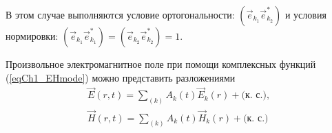 В этом случае выполняются условие ортогональности:
$\left(\vec{e}_{k_1} \vec{e}_{k_2}^{*}\right)$
и условия нормировки:
$\left(\vec{e}_{k_1} \vec{e}_{k_1}^{*}\right) = \left(\vec{e}_{k_2}
\vec{e}_{k_2}^{*}\right) = 1$.

Произвольное электромагнитное поле при помощи комплексных функций 
(\ref{eqCh1_EHmode}) можно представить разложениями 
\begin{eqnarray}
\vec{E}\left(r, t\right) = 
\sum_{(k)} 
A_k\left(t\right) \vec{E}_k\left(r\right) + \mbox{(к. с.)},
\nonumber \\
\vec{H}\left(r, t\right) = 
\sum_{(k)} 
A_k\left(t\right) \vec{H}_k\left(r\right) +
\mbox{(к. с.)}
\end{eqnarray}
